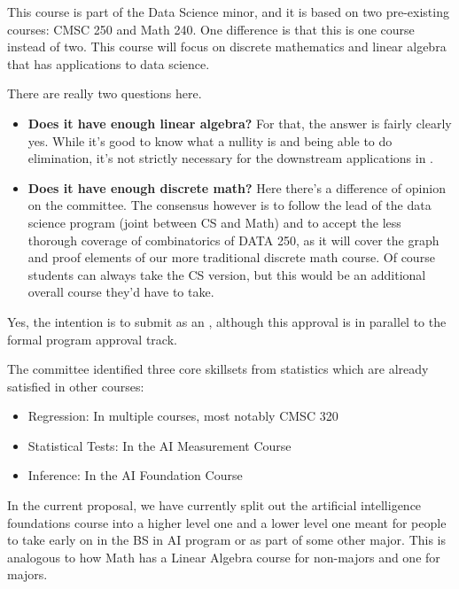 

This course is part of the Data Science minor, and it is based on two pre-existing courses: CMSC 250 and
Math 240. One difference is that this is one course instead of two. This course will focus on discrete
mathematics and linear algebra that has applications to data science. 

There are really two questions here.  
\begin{itemize}
    \item \textbf{Does it have enough linear algebra?}  For that, the answer is fairly clearly yes.  While it's good to know what a nullity is and being able to do elimination, it's not strictly necessary for the downstream applications in \ai{}.
    \item \textbf{Does it have enough discrete math?}  Here there's a difference of opinion on the committee.  The consensus however is to follow the lead of the data science program (joint between CS and Math) and to accept the less thorough coverage of combinatorics of DATA 250, as it will cover the graph and proof elements of our more traditional discrete math course.  Of course students can always take the CS version, but this would be an additional overall course they'd have to take.
\end{itemize}



Yes, the intention is to submit as an , although this approval is in parallel to the formal program approval track.


The committee identified three core skillsets from statistics which are already satisfied in other courses:
\begin{itemize}
    \item Regression: In multiple courses, most notably CMSC 320
    \item Statistical Tests: In the AI Measurement Course
    \item Inference: In the AI Foundation Course
\end{itemize}


In the current proposal, we have currently split out the artificial intelligence foundations course into a higher level one and a lower level one meant for people to take early on in the BS in AI program or as part of some other major.  This is analogous to how Math has a Linear Algebra course for non-majors and one for majors.

